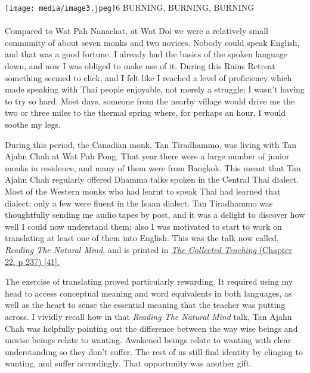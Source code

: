 \texttt{[image: media/image3.jpeg]}6
BURNING, BURNING, BURNING\\
~\\
Compared to Wat Pah Nanachat, at Wat Doi we were a relatively small
community of about seven monks and two novices. Nobody could speak
English, and that was a good fortune. I already had the basics of the
spoken language down, and now I was obliged to make use of it. During
this Rains Retreat something seemed to click, and I felt like I reached
a level of proficiency which made speaking with Thai people enjoyable,
not merely a struggle; I wasn't having to try so hard. Most days,
someone from the nearby village would drive me the two or three miles to
the thermal spring where, for perhaps an hour, I would soothe my legs.

During this period, the Canadian monk, Tan Tiradhammo, was living with
Tan Ajahn Chah at Wat Pah Pong. That year there were a large number of
junior monks in residence, and many of them were from Bangkok. This
meant that Tan Ajahn Chah regularly offered Dhamma talks spoken in the
Central Thai dialect. Most of the Western monks who had learnt to speak
Thai had learned that dialect; only a few were fluent in the Isaan
dialect. Tan Tiradhammo was thoughtfully sending me audio tapes by post,
and it was a delight to discover how well I could now understand them;
also I was motivated to start to work on translating at least one of
them into English. This was the talk now called, \emph{Reading The
Natural Mind}, and is printed in
\href{https://forestsangha.org/teachings/books/the-collected-teachings-of-ajahn-chah-single-volume?language=English}{\emph{\underline{The
Collected Teaching}} (Chapter 22, p 237) {[}41{]}.}

The exercise of translating proved particularly rewarding. It required
using my head to access conceptual meaning and word equivalents in both
languages, as well as the heart to sense the essential meaning that the
teacher was putting across. I vividly recall how in that \emph{Reading
The Natural Mind} talk, Tan Ajahn Chah was helpfully pointing out the
difference between the way wise beings and unwise beings relate to
wanting. Awakened beings relate to wanting with clear understanding so
they don't suffer. The rest of us still find identity by clinging to
wanting, and suffer accordingly. That opportunity was another gift.

